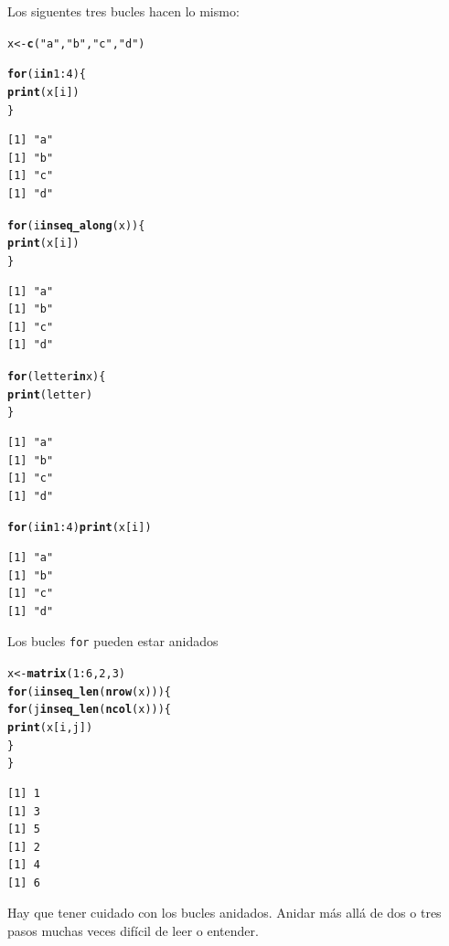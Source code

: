 \documentclass{article}\usepackage[]{graphicx}\usepackage[]{color}
\makeatletter
\newcommand{\hlnum}[1]{\textcolor[rgb]{0.686,0.059,0.569}{#1}}%
\newcommand{\hlstr}[1]{\textcolor[rgb]{0.192,0.494,0.8}{#1}}%
\newcommand{\hlopt}[1]{\textcolor[rgb]{0,0,0}{#1}}%
\newcommand{\hlstd}[1]{\textcolor[rgb]{0.345,0.345,0.345}{#1}}%
\newcommand{\hlkwa}[1]{\textcolor[rgb]{0.161,0.373,0.58}{\textbf{#1}}}%
\newcommand{\hlkwb}[1]{\textcolor[rgb]{0.69,0.353,0.396}{#1}}%
\newcommand{\hlkwd}[1]{\textcolor[rgb]{0.737,0.353,0.396}{\textbf{#1}}}%
\newenvironment{kframe}{%
 \def\at@end@of@kframe{}%
 \ifinner\ifhmode%
  \def\at@end@of@kframe{\end{minipage}}%
  \begin{minipage}{\columnwidth}%
 \fi\fi%
 \def\FrameCommand##1{\hskip\@totalleftmargin \hskip-\fboxsep
 \colorbox{shadecolor}{##1}\hskip-\fboxsep
     \hskip-\linewidth \hskip-\@totalleftmargin \hskip\columnwidth}%
 \MakeFramed {\advance\hsize-\width
   \@totalleftmargin\z@ \linewidth\hsize
   \@setminipage}}%
 {\par\unskip\endMakeFramed%
 \at@end@of@kframe}
\newenvironment{knitrout}{}{} %
\makeatother
\begin{document}
  Los siguentes tres bucles hacen lo mismo:
\begin{knitrout}
\color{fgcolor}\begin{kframe}
\begin{alltt}
  \hlstd{x} \hlkwb{<-} \hlkwd{c}\hlstd{(}\hlstr{"a"}\hlstd{,} \hlstr{"b"}\hlstd{,} \hlstr{"c"}\hlstd{,} \hlstr{"d"}\hlstd{)}

  \hlkwa{for}\hlstd{(i} \hlkwa{in} \hlnum{1}\hlopt{:}\hlnum{4}\hlstd{)\{}
    \hlkwd{print}\hlstd{(x[i])}
  \hlstd{\}}
\end{alltt}
\begin{verbatim}
[1] "a"
[1] "b"
[1] "c"
[1] "d"
\end{verbatim}
\begin{alltt}
  \hlkwa{for}\hlstd{(i} \hlkwa{in} \hlkwd{seq_along}\hlstd{(x))\{}
    \hlkwd{print}\hlstd{(x[i])}
  \hlstd{\}}
\end{alltt}
\begin{verbatim}
[1] "a"
[1] "b"
[1] "c"
[1] "d"
\end{verbatim}
\begin{alltt}
  \hlkwa{for}\hlstd{(letter} \hlkwa{in} \hlstd{x)\{}
    \hlkwd{print}\hlstd{(letter)}
  \hlstd{\}}
\end{alltt}
\begin{verbatim}
[1] "a"
[1] "b"
[1] "c"
[1] "d"
\end{verbatim}
\begin{alltt}
  \hlkwa{for}\hlstd{(i} \hlkwa{in} \hlnum{1}\hlopt{:}\hlnum{4}\hlstd{)} \hlkwd{print}\hlstd{(x[i])}
\end{alltt}
\begin{verbatim}
[1] "a"
[1] "b"
[1] "c"
[1] "d"
\end{verbatim}
\end{kframe}
\end{knitrout}
  
  Los bucles \texttt{for} pueden estar anidados
\begin{knitrout}
\color{fgcolor}\begin{kframe}
\begin{alltt}
  \hlstd{x} \hlkwb{<-} \hlkwd{matrix} \hlstd{(}\hlnum{1}\hlopt{:}\hlnum{6}\hlstd{,} \hlnum{2}\hlstd{,} \hlnum{3}\hlstd{)}
  \hlkwa{for}\hlstd{(i} \hlkwa{in} \hlkwd{seq_len}\hlstd{(}\hlkwd{nrow}\hlstd{(x)))\{}
    \hlkwa{for}\hlstd{(j} \hlkwa{in} \hlkwd{seq_len}\hlstd{(}\hlkwd{ncol}\hlstd{(x)))\{}
      \hlkwd{print}\hlstd{(x[i, j])}
    \hlstd{\}}
  \hlstd{\}}
\end{alltt}
\begin{verbatim}
[1] 1
[1] 3
[1] 5
[1] 2
[1] 4
[1] 6
\end{verbatim}
\end{kframe}
\end{knitrout}
  Hay que tener cuidado con los bucles anidados. Anidar más allá de dos o tres pasos muchas veces difícil de leer o entender.
  
\end{document}
